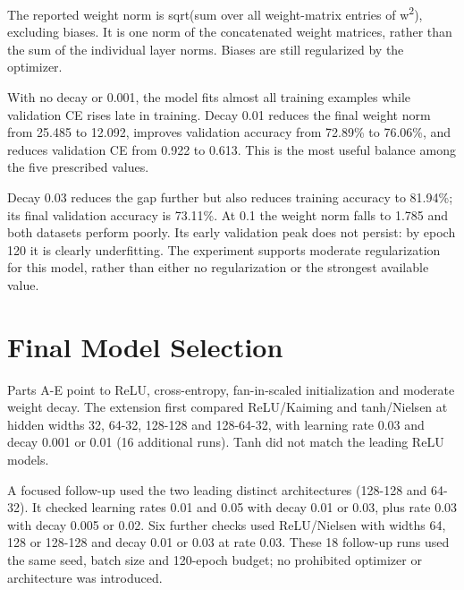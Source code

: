 \documentclass[11pt,a4paper]{article}
\begin{document}
The reported weight norm is sqrt(sum over all weight-matrix entries of w\textsuperscript{2}), excluding biases. It is one norm of the concatenated weight matrices, rather than the sum of the individual layer norms. Biases are still regularized by the optimizer.


With no decay or 0.001, the model fits almost all training examples while validation CE rises late in training. Decay 0.01 reduces the final weight norm from 25.485 to 12.092, improves validation accuracy from 72.89\% to 76.06\%, and reduces validation CE from 0.922 to 0.613. This is the most useful balance among the five prescribed values.


Decay 0.03 reduces the gap further but also reduces training accuracy to 81.94\%; its final validation accuracy is 73.11\%. At 0.1 the weight norm falls to 1.785 and both datasets perform poorly. Its early validation peak does not persist: by epoch 120 it is clearly underfitting. The experiment supports moderate regularization for this model, rather than either no regularization or the strongest available value.


\section{Final Model Selection}

Parts A-E point to ReLU, cross-entropy, fan-in-scaled initialization and moderate weight decay. The extension first compared ReLU/Kaiming and tanh/Nielsen at hidden widths 32, 64-32, 128-128 and 128-64-32, with learning rate 0.03 and decay 0.001 or 0.01 (16 additional runs). Tanh did not match the leading ReLU models.


A focused follow-up used the two leading distinct architectures (128-128 and 64-32). It checked learning rates 0.01 and 0.05 with decay 0.01 or 0.03, plus rate 0.03 with decay 0.005 or 0.02. Six further checks used ReLU/Nielsen with widths 64, 128 or 128-128 and decay 0.01 or 0.03 at rate 0.03. These 18 follow-up runs used the same seed, batch size and 120-epoch budget; no prohibited optimizer or architecture was introduced.
\end{document}
